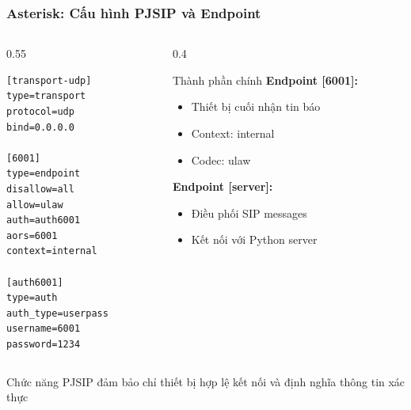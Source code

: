 \iffalse
\begin{frame}[fragile]
\frametitle{Asterisk: Cấu hình PJSIP và Endpoint}

\begin{columns}[t]
\begin{column}{0.55\textwidth}
\begin{verbatim}
[transport-udp]
type=transport
protocol=udp
bind=0.0.0.0

[6001]
type=endpoint
disallow=all
allow=ulaw
auth=auth6001
aors=6001
context=internal

[auth6001]
type=auth
auth_type=userpass
username=6001
password=1234
\end{verbatim}
\end{column}

\begin{column}{0.4\textwidth}
\begin{block}{Thành phần chính}
\textbf{Endpoint [6001]:}
\begin{itemize}
\item Thiết bị cuối nhận tin báo
\item Context: internal
\item Codec: ulaw
\end{itemize}

\textbf{Endpoint [server]:}
\begin{itemize}
\item Điều phối SIP messages
\item Kết nối với Python server
\end{itemize}
\end{block}
\end{column}
\end{columns}

\vspace{0.2cm}
\begin{alertblock}{Chức năng}
PJSIP đảm bảo chỉ thiết bị hợp lệ kết nối và định nghĩa thông tin xác thực
\end{alertblock}

\end{frame}

